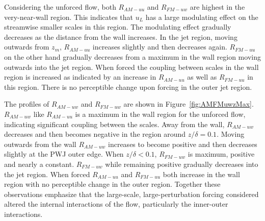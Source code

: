 Considering the unforced flow, both $R_{AM-uu}$ and $R_{FM-uw}$ are highest in the very-near-wall region. This indicates that $u_L$ has a large modulating effect on the streamwise smaller scales in this region. The modulating effect gradually decreases as the distance from the wall increases. In the jet region, moving outwards from $z_m$, $R_{AM-uu}$ increases slightly and then decreases again. $R_{FM-uu}$ on the other hand gradually decreases from a maximum in the wall region moving outwards into the jet region. When forced the coupling between scales in the wall region is increased as indicated by an increase in $R_{AM-uu}$ as well as $R_{FM-uu}$ in this region. There is no perceptible change upon forcing in the outer jet region. 

The profiles of $R_{AM-uw}$ and $R_{FM-uw}$ are shown in Figure~\ref{fig:AMFMuwzMax}. $R_{AM-uw}$ like $R_{AM-uu}$ is a maximum in the wall region for the unforced flow, indicating significant coupling between the scales. Away from the wall, $R_{AM-uw}$ decreases and then becomes negative in the region around $z/\delta=0.1$. Moving outwards from the wall $R_{AM-uw}$ increases to become positive and then decreases slightly at the PWJ outer edge. When $z/\delta<0.1$, $R_{FM-uw}$ is maximum, positive and nearly a constant. $R_{FM-uw}$ while remaining positive gradually decreases into the jet region. When forced $R_{AM-uu}$ and $R_{FM-uu}$ both increase in the wall region with no perceptible change in the outer region. Together these observations emphasize that the large-scale, large-perturbation forcing considered altered the internal interactions of the flow, particularly the inner-outer interactions.